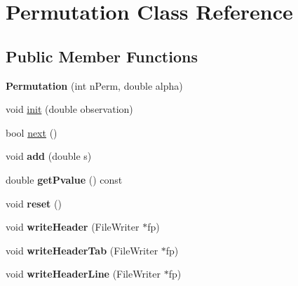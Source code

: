 \hypertarget{classPermutation}{\section{Permutation Class Reference}
\label{classPermutation}
}
\subsection*{Public Member Functions}
\begin{DoxyCompactItemize}
\item 
\hypertarget{classPermutation_a265c2e656ff622e587108bf78fd6eaee}{{\bfseries Permutation} (int n\-Perm, double alpha)}\label{classPermutation_a265c2e656ff622e587108bf78fd6eaee}

\item 
void \hyperlink{classPermutation_a6253565860ce50c687a01ab6bfe4af2d}{init} (double observation)
\item 
bool \hyperlink{classPermutation_afe33da36f035988a7edf0d131119d26c}{next} ()
\item 
\hypertarget{classPermutation_aead055d6fa313f827a852d53018cf8b2}{void {\bfseries add} (double s)}\label{classPermutation_aead055d6fa313f827a852d53018cf8b2}

\item 
\hypertarget{classPermutation_aa9559076625fb951293dab295d426e32}{double {\bfseries get\-Pvalue} () const }\label{classPermutation_aa9559076625fb951293dab295d426e32}

\item 
\hypertarget{classPermutation_a03558b5588a16e736ce47210dd2d7160}{void {\bfseries reset} ()}\label{classPermutation_a03558b5588a16e736ce47210dd2d7160}

\item 
\hypertarget{classPermutation_a8d8f3cc96c140f968074a33f13108153}{void {\bfseries write\-Header} (File\-Writer $\ast$fp)}\label{classPermutation_a8d8f3cc96c140f968074a33f13108153}

\item 
\hypertarget{classPermutation_a23de2ef8bd0153734ae6052d2106d7ac}{void {\bfseries write\-Header\-Tab} (File\-Writer $\ast$fp)}\label{classPermutation_a23de2ef8bd0153734ae6052d2106d7ac}

\item 
\hypertarget{classPermutation_aa2cf974a868c979a928bc356be1882df}{void {\bfseries write\-Header\-Line} (File\-Writer $\ast$fp)}\label{classPermutation_aa2cf974a868c979a928bc356be1882df}


\end{DoxyCompactItemize}
